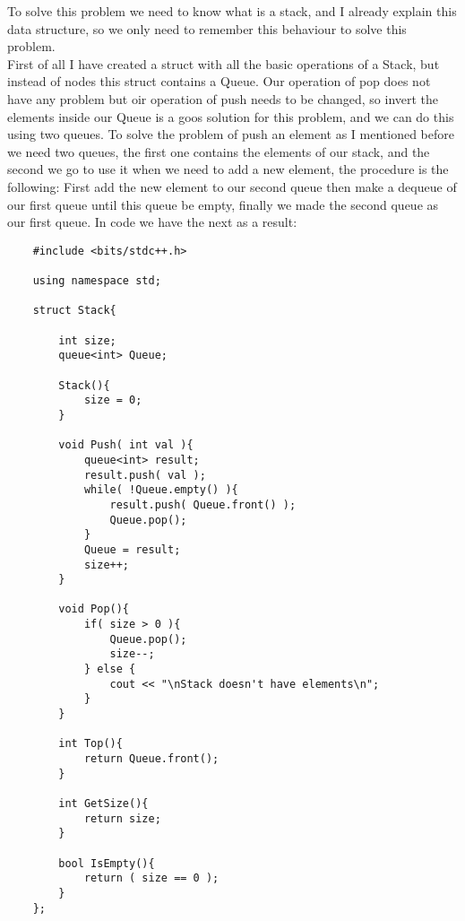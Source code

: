 To solve this problem we need to know what is a stack, and I already explain this data structure, so we only need to remember this behaviour to solve this problem.\\
First of all I have created a struct with all the basic operations of a Stack, but instead of nodes this struct contains a Queue.
Our operation of pop does not have any problem but oir operation of push needs to be changed, so invert the elements inside our Queue is a goos solution for this problem, and we can do this using two queues.
To solve the problem of push an element as I mentioned before we need two queues, the first one contains the elements of our stack, and the second we go to use it when we need to add a new element, the procedure is the following:
First add the new element to our second queue then make a dequeue of our first queue until this queue be empty, finally we made the second queue as our first queue. In code we have the next as a result:

\begin{lstlisting}
    #include <bits/stdc++.h>

    using namespace std;

    struct Stack{

        int size;
        queue<int> Queue;

        Stack(){
            size = 0;
        }

        void Push( int val ){
            queue<int> result;
            result.push( val );
            while( !Queue.empty() ){
                result.push( Queue.front() );
                Queue.pop();
            }
            Queue = result;
            size++;
        }

        void Pop(){
            if( size > 0 ){
                Queue.pop();
                size--;
            } else {
                cout << "\nStack doesn't have elements\n";
            }
        }

        int Top(){
            return Queue.front();
        }

        int GetSize(){
            return size;
        }

        bool IsEmpty(){
            return ( size == 0 );
        }
    };
\end{lstlisting}

